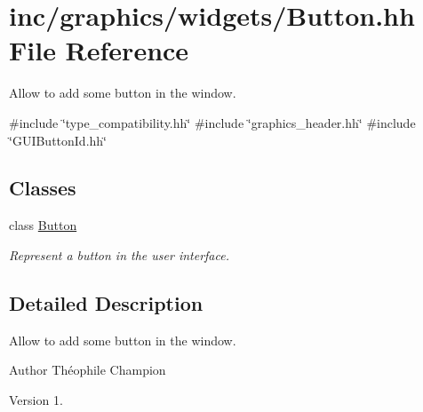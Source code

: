 \hypertarget{Button_8hh}{}\section{inc/graphics/widgets/\+Button.hh File Reference}
\label{Button_8hh}


Allow to add some button in the window.  


{\ttfamily \#include \char`\"{}type\+\_\+compatibility.\+hh\char`\"{}}\newline
{\ttfamily \#include \char`\"{}graphics\+\_\+header.\+hh\char`\"{}}\newline
{\ttfamily \#include \char`\"{}G\+U\+I\+Button\+Id.\+hh\char`\"{}}\newline
\subsection*{Classes}
\begin{DoxyCompactItemize}
\item 
class \hyperlink{classButton}{Button}
\begin{DoxyCompactList}\small\item\em Represent a button in the user interface. \end{DoxyCompactList}\end{DoxyCompactItemize}


\subsection{Detailed Description}
Allow to add some button in the window. 

\begin{DoxyAuthor}{Author}
Théophile Champion 
\end{DoxyAuthor}
\begin{DoxyVersion}{Version}
1. 
\end{DoxyVersion}
